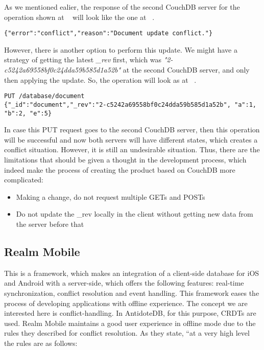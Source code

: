 As we mentioned ealier, the response of the second CouchDB server for the operation shown at ~ will look like the one at ~.

\begin{lstlisting}[caption={The demonstration of a conflict situation happening, when the \textit{\_rev} of sent operation and the one at the server do not match.}, label={lst:rwork8}]
{"error":"conflict","reason":"Document update conflict."}
\end{lstlisting}

However, there is another option to perform this update. We might have a strategy of getting the latest \textit{\_rev} first, which was \textit{"2-c5242a69558bf0c24dda59b585d1a52b"} at the second CouchDB server, and only then applying the update. So, the operation will look as at ~.

\begin{lstlisting}[caption={Updating the value of item \textit{document} by adding element \textit{e} and removing previously added element \textit{d} after receiving the new \textit{\_rev} from the second CouchDB server.}, label={lst:rwork9}]
PUT /database/document
{"_id":"document","_rev":"2-c5242a69558bf0c24dda59b585d1a52b", "a":1, "b":2, "e":5}
\end{lstlisting}

In case this PUT request goes to the second CouchDB server, then this operation will be successful and now both servers will have different states, which creates a conflict situation. 
However, it is still an undesirable situation. Thus, there are the limitations that should be given a thought in the development process, which indeed make the process of creating the product based on CouchDB more complicated:
    \begin{itemize}
        \item {Making a change, do not request multiple GETs and POSTs}
        \item {Do not update the \_rev locally in the client without getting new data from the server before that}
      \end{itemize}

\subsection*{Realm Mobile}

This is a framework, which makes an integration of a client-side database for iOS and Android with a server-side, which offers the following features: real-time synchronization, conflict resolution and event handling. This framework eases the process of developing applications with offline experience. The concept we are interested here is conflict-handling. In AntidoteDB, for this purpose, CRDTs are used. Realm Mobile maintains a good user experience in offline mode due to the rules they described for conflict resolution.
As they state, ``at a very high level the rules are as follows:

